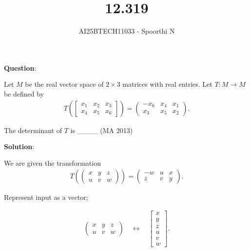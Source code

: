 \documentclass[journal,12pt,onecolumn]{IEEEtran}
\begin{document}
\title{12.319}
\author{AI25BTECH11033 - Spoorthi N}
{\let\newpage\relax\maketitle}

\textbf{Question}:

Let $M$ be the real vector space of $2 \times 3$ matrices with real entries.  
Let $T : M \to M$ be defined by
\begin{align}
T\!\left( 
\begin{bmatrix}
x_{1} & x_{2} & x_{3} \\
x_{4} & x_{5} & x_{6}
\end{bmatrix}
\right)
=
\begin{pmatrix}
-x_{6} & x_{4} & x_{1} \\
x_{3} & x_{5} & x_{2}
\end{pmatrix}.
\end{align}

The determinant of $T$ is \_\_\_\_ \hfill (MA 2013)

\textbf{Solution}:

We are given the transformation
\begin{align}
T\!\left(
\begin{pmatrix}
x & y & z \\
u & v & w
\end{pmatrix}
\right)
=
\begin{pmatrix}
-w & u & x \\
z & v & y
\end{pmatrix}.
\end{align}

Represent input as a vector;

\begin{align}
\begin{pmatrix}
x & y & z \\
u & v & w
\end{pmatrix}
\quad \longleftrightarrow \quad
\begin{bmatrix}
x \\ y \\ z \\ u \\ v \\ w
\end{bmatrix}.
\end{align}
\end{document}
